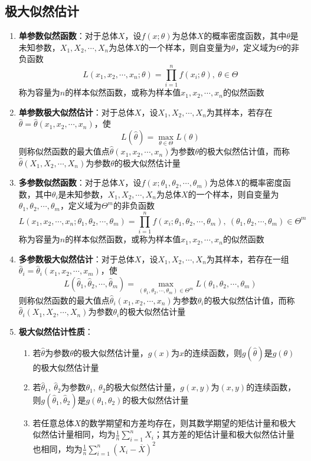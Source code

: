 \documentclass[12pt,a4paper,UTF8]{book}
\begin{document}
\subsection{极大似然估计}
\begin{enumerate}
\item \textbf{单参数似然函数}：对于总体$X$，设$f\left(x;\theta\right)$为总体$X$的概率密度函数，其中$\theta$是未知参数，$X_1,X_2,\cdots,X_n$为总体$X$的一个样本，则自变量为$\theta$，定义域为$\varTheta$的非负函数
\[L\left(x_1,x_2,\cdots,x_n;\theta\right)=\prod\limits_{i=1}^{n}f\left(x_i;\theta\right),\ \theta\in\varTheta\]
称为容量为$n$的样本似然函数，或称为样本值$x_1,x_2,\cdots,x_n$的似然函数
\item \textbf{单参数极大似然估计}：对于总体$X$，设$X_1,X_2,\cdots,X_n$为其样本，若存在$\hat{\theta}=\hat{\theta}\left(x_1,x_2,\cdots,x_n\right)$，使
\[L\left(\hat{\theta}\right)=\max\limits_{\theta\in\varTheta}L\left(\theta\right)\]
则称似然函数的最大值点$\hat{\theta}\left(x_1,x_2,\cdots,x_n\right)$为参数$\theta$的极大似然估计值，而称$\hat{\theta}\left(X_1,X_2,\cdots,X_n\right)$为参数$\theta$的极大似然估计量
\item \textbf{多参数似然函数}：对于总体$X$，设$f\left(x;\theta_1,\theta_2,\cdots,\theta_m\right)$为总体$X$的概率密度函数，其中$\theta_i$是未知参数，$X_1,X_2,\cdots,X_n$为总体$X$的一个样本，则自变量为$\theta_1,\theta_2,\cdots,\theta_m$，定义域为$\varTheta^m$的非负函数
\[L\left(x_1,x_2,\cdots,x_n;\theta_1,\theta_2,\cdots,\theta_m\right)=\prod\limits_{i=1}^{n}f\left(x_i;\theta_1,\theta_2,\cdots,\theta_m\right),\ \left(\theta_1,\theta_2,\cdots,\theta_m\right)\in\varTheta^m\]
称为容量为$n$的样本似然函数，或称为样本值$x_1,x_2,\cdots,x_n$的似然函数
\item \textbf{多参数极大似然估计}：对于总体$X$，设$X_1,X_2,\cdots,X_n$为其样本，若存在一组$\hat{\theta}_i=\hat{\theta}_i\left(x_1,x_2,\cdots,x_m\right)$，使
\[L\left(\hat{\theta}_1,\hat{\theta}_2,\cdots,\hat{\theta}_m\right)=\max\limits_{\left(\theta_1,\theta_2,\cdots,\theta_m\right)\in\varTheta^m}L\left(\theta_1,\theta_2,\cdots,\theta_m\right)\]
则称似然函数的最大值点$\hat{\theta}_i\left(x_1,x_2,\cdots,x_n\right)$为参数$\theta_i$的极大似然估计值，而称$\hat{\theta}_i\left(X_1,X_2,\cdots,X_n\right)$为参数$\theta_i$的极大似然估计量
\item \textbf{极大似然估计性质}：
\begin{enumerate}
\item 若$\hat{\theta}$为参数$\theta$的极大似然估计量，$g\left(x\right)$为$x$的连续函数，则$g\left(\hat{\theta}\right)$是$g\left(\theta\right)$的极大似然估计量
\item 若$\hat{\theta}_1,\ \hat{\theta}_2$为参数$\theta_1,\ \theta_2$的极大似然估计量，$g\left(x,y\right)$为$\left(x,y\right)$的连续函数，则$g\left(\hat{\theta}_1,\hat{\theta}_2\right)$是$g\left(\theta_1,\theta_2\right)$的极大似然估计量
\item 若任意总体$X$的数学期望和方差均存在，则其数学期望的矩估计量和极大似然估计量相同，均为$\frac{1}{n}\sum\limits_{i=1}^{n}X_i$；其方差的矩估计量和极大似然估计量也相同，均为$\frac{1}{n}\sum\limits_{i=1}^{n}\left(X_i-\overline{X}\right)^2$
\end{enumerate}
\end{enumerate}
\end{document}
